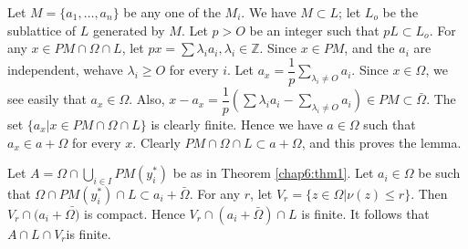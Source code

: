 Let $M=\bigg \{a_1,\ldots ,a_n \bigg \}$ be any one of the $M_i$. We
have $M \subset L$; let $L_o$ be the sublattice of $L$ generated by
$M$. Let $p>O$ be an integer such that $p L \subset L_o$. For any $ x
\in PM \cap \Omega \cap L$, let $px =\sum \lambda_i a_i, \lambda_i \in
\mathbb{Z}$. Since $x \in PM$, and the $a_i$ are independent,
we\pageoriginale have 
$\lambda_i \geq O$ for every $i$. Let $a_x =\dfrac{1}{p} \sum
\limits_{\lambda_i \neq O}a_i$. Since $x \in \Omega$, we see easily
that $a_x \in \Omega$. Also, $x-a_x = \dfrac{1}{p}(\sum \lambda_i a_i-
\sum \limits_{\lambda_i \neq O}a_i) \in PM \subset \bar{\Omega}$. The
set $\bigg \{ a_x | x \in PM \cap \Omega \cap L \bigg \}$ is clearly
finite. Hence we have $a \in \Omega $ such that $a_x \in a+\Omega$ for
every $x$. Clearly $PM \cap \Omega \cap L \subset a+ \Omega $, and
this proves the lemma.
 

\setcounter{proofofThm}{1}
\begin{proofofThm} %
  Let $A = \Omega \cap \bigcup \limits_{i \in I}PM (y^*_i)$ be as in
  Theorem \ref{chap6:thm1}. Let $a_i \in \Omega$ be such that $\Omega \cap
  PM(y^*_i)\cap L \subset a_i + \bar{\Omega}$. For any $r$, let $V_r =
  \bigg \{ z \in \Omega | \nu (z) \leq r \bigg \}$. Then $V_r \cap (a_i
  + \bar{\Omega)}$ is compact. Hence $V_r \cap (a_i + \bar{\Omega})\cap
  L$ is finite. It follows that $A \cap L \cap V_r$is finite. 
\end{proofofThm}

